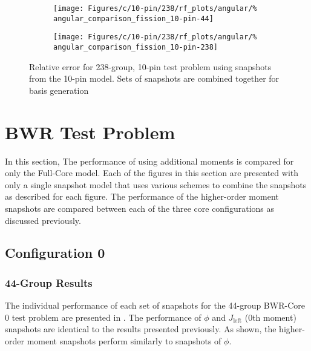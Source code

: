 \begin{figure*}[tb]
    \centering
    \begin{subfigure}{0.5\textwidth}
        \centering
        \texttt{[image: Figures/c/10-pin/238/rf\_plots/angular/\%
            angular\_comparison\_fission\_10-pin-44]}
    \end{subfigure}%
    \begin{subfigure}{0.5\textwidth}
        \centering
        \texttt{[image: Figures/c/10-pin/238/rf\_plots/angular/\%
            angular\_comparison\_fission\_10-pin-238]}
    \end{subfigure}
    \caption{Relative error for 238-group, 10-pin test problem using 
        snapshots from the 10-pin model.  Sets of snapshots are combined 
        together for basis generation}
    \label{fig:10-pin_10-pin-combined-238}
\end{figure*}

\section{BWR Test Problem}

In this section,  The performance of using additional moments is compared for 
only the Full-Core model.  Each of the figures in this 
section are presented with only a single snapshot model that uses various 
schemes to combine the snapshots as described for each figure.  The performance 
of the higher-order moment snapshots are compared between each of the three 
core configurations as discussed previously.

\subsection{Configuration 0}

\subsubsection{44-Group Results}

The individual performance of each set of snapshots for the 44-group BWR-Core 0
test problem are presented in .  The 
performance of $\phi$ and $J_{\text{left}}$ (0th moment) snapshots are 
identical to the results presented previously.  As shown, the higher-order 
moment snapshots perform similarly to snapshots of $\phi$.


